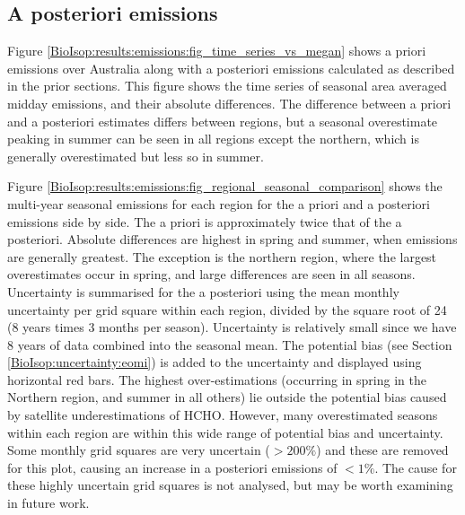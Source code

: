   \subsection{A posteriori emissions}
    \label{BioIsop:results:emissions}
    
    Figure \ref{BioIsop:results:emissions:fig_time_series_vs_megan} shows a priori emissions over Australia along with a posteriori emissions calculated as described in the prior sections.
    This figure shows the time series of seasonal area averaged midday emissions, and their absolute differences.
    The difference between a priori and a posteriori estimates differs between regions, but a seasonal overestimate peaking in summer can be seen in all regions except the northern, which is generally overestimated but less so in summer.
    
    
    
    
    Figure \ref{BioIsop:results:emissions:fig_regional_seasonal_comparison} shows the multi-year seasonal emissions for each region for the a priori and a posteriori emissions side by side.
    The a priori is approximately twice that of the a posteriori.
    Absolute differences are highest in spring and summer, when emissions are generally greatest.
    The exception is the northern region, where the largest overestimates occur in spring, and large differences are seen in all seasons.
    Uncertainty is summarised for the a posteriori using the mean monthly uncertainty per grid square within each region, divided by the square root of 24 (8 years times 3 months per season).
    Uncertainty is relatively small since we have 8 years of data combined into the seasonal mean.
    The potential bias (see Section \ref{BioIsop:uncertainty:eomi}) is added to the uncertainty and displayed using horizontal red bars.
    The highest over-estimations (occurring in spring in the Northern region, and summer in all others) lie outside the potential bias caused by satellite underestimations of HCHO.
    However, many overestimated seasons within each region are within this wide range of potential bias and uncertainty.
    Some monthly grid squares are very uncertain ($>200\%$) and these are removed for this plot, causing an increase in a posteriori emissions of $<1\%$.
    The cause for these highly uncertain grid squares is not analysed, but may be worth examining in future work.
    
